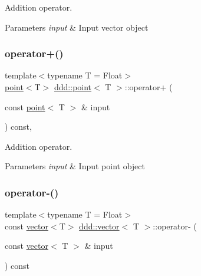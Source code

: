 Addition operator. 


\begin{DoxyParams}{Parameters}
{\em input} & Input vector object \\
\hline
\end{DoxyParams}
\mbox{\label{classddd_1_1point_ab0b0c990b117bb889d34d44509b645be}} 
\subsubsection{\texorpdfstring{operator+()}{operator+()}\hspace{0.1cm}{\footnotesize\ttfamily [2/2]}}
{\footnotesize\ttfamily template$<$typename T = Float$>$ \\
\hyperlink{classddd_1_1point}{point}$<$T$>$ \hyperlink{classddd_1_1point}{ddd\+::point}$<$ T $>$\+::operator+ (\begin{DoxyParamCaption}\item[{const \hyperlink{classddd_1_1point}{point}$<$ T $>$ \&}]{input }\end{DoxyParamCaption}) const\hspace{0.3cm}{\ttfamily [inline]}, {\ttfamily [inherited]}}



Addition operator. 


\begin{DoxyParams}{Parameters}
{\em input} & Input point object \\
\hline
\end{DoxyParams}
\mbox{\label{classddd_1_1vector_a6d3a62dbfdd3747aa5f640f18aef9220}} 
\subsubsection{\texorpdfstring{operator-\/()}{operator-()}\hspace{0.1cm}{\footnotesize\ttfamily [1/2]}}
{\footnotesize\ttfamily template$<$typename T = Float$>$ \\
const \hyperlink{classddd_1_1vector}{vector}$<$T$>$ \hyperlink{classddd_1_1vector}{ddd\+::vector}$<$ T $>$\+::operator-\/ (\begin{DoxyParamCaption}\item[{const \hyperlink{classddd_1_1vector}{vector}$<$ T $>$ \&}]{input }\end{DoxyParamCaption}) const\hspace{0.3cm}{\ttfamily [inline]}}



